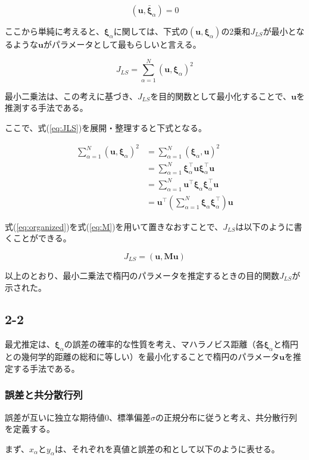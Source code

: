 \documentclass[12pt,a4j]{jsarticle}
\newcommand{\xa}{x_\alpha}
\newcommand{\ya}{y_\alpha}
\newcommand{\xia}{\bm{\xi}_\alpha}
\newcommand{\bxia}{\bar{\bm{\xi}}_\alpha}
\begin{document}
  \begin{equation}
    (\bm{u}, \bxia) = 0 \label{eq:uxia0}
  \end{equation}

  ここから単純に考えると、$\xia$に関しては、下式の$(\bm{u}, \xia)$の2乗和$J_{LS}$が最小となるような$\bm{u}$がパラメータとして最もらしいと言える。

  \begin{equation}
    J_{LS} = \sum_{\alpha = 1}^N (\bm{u}, \xia)^2 \label{eq:JLS}
  \end{equation}

  最小二乗法は、この考えに基づき、$J_{LS}$を目的関数として最小化することで、$\bm{u}$を推測する手法である。\par
  ここで、式(\ref{eq:JLS})を展開・整理すると下式となる。

  \begin{align}
    \sum_{\alpha = 1}^N (\bm{u}, \xia)^2 &= \sum_{\alpha = 1}^N (\xia, \bm{u})^2 \nonumber \\
     &= \sum_{\alpha = 1}^N \xia^\top \bm{u} \xia^\top \bm{u} \nonumber \\
     &= \sum_{\alpha = 1}^N \bm{u}^\top \xia \xia^\top \bm{u} \nonumber \\
     &= \bm{u}^\top \left(\sum_{\alpha = 1}^N \xia \xia^\top \right) \bm{u} \label{eq:organized}
  \end{align}

  式(\ref{eq:organized})を式(\ref{eq:M})を用いて置きなおすことで、$J_{LS}$は以下のように書くことができる。

  \begin{equation}
    J_{LS} = (\bm{u}, \bm{Mu})
  \end{equation}

  以上のとおり、最小二乗法で楕円のパラメータを推定するときの目的関数$J_{LS}$が示された。

  \subsection*{2-2}
    最尤推定は、$\xia$の誤差の確率的な性質を考え、マハラノビス距離（各$\xia$と楕円との幾何学的距離の総和に等しい）を最小化することで楕円のパラメータ$\bm{u}$を推定する手法である。
  
    \subsubsection*{誤差と共分散行列}
      誤差が互いに独立な期待値$0$、標準偏差$\sigma$の正規分布に従うと考え、共分散行列を定義する。\par
      まず、$\xa$と$\ya$は、それぞれを真値と誤差の和として以下のように表せる。
\end{document}
